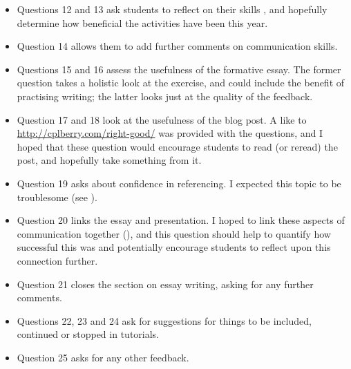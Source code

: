 \begin{itemize}
\item Questions 12 and 13 ask students to reflect on their skills \citep[cf.][figure 4.15, section C]{Brown1988}, and hopefully determine how beneficial the activities have been this year.
\item Question 14 allows them to add further comments on communication skills.
\item Questions 15 and 16 assess the usefulness of the formative essay. The former question takes a holistic look at the exercise, and could include the benefit of practising writing; the latter looks just at the quality of the feedback.
\item Question 17 and 18 look at the usefulness of the blog post. A like to \url{http://cplberry.com/right-good/} was provided with the questions, and I hoped that these question would encourage students to read (or reread) the post, and hopefully take something from it.
\item Question 19 asks about confidence in referencing. I expected this topic to be troublesome (see ).
\item Question 20 links the essay and presentation. I hoped to link these aspects of communication together (), and this question should help to quantify how successful this was and potentially encourage students to reflect upon this connection further.
\item Question 21 closes the section on essay writing, asking for any further comments.
\item Questions 22, 23 and 24 ask for suggestions for things to be included, continued or stopped in tutorials.
\item Question 25 asks for any other feedback.
\end{itemize}

